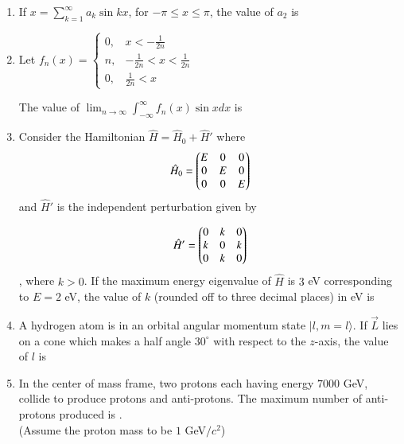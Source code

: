 \documentclass[journal,12pt,onecolumn]{IEEEtran}
\theoremstyle{remark}
\begin{document}
\begin{enumerate}
    \item If $x = \sum_{k=1}^{\infty} a_k \sin k x$, for $-\pi \leq x \leq \pi$, the value of $a_2$ is \underline{\hspace{2cm}}
    
    \item Let $f_n(x) = \begin{cases}
        0, & x < -\frac{1}{2n}\\
        n, & -\frac{1}{2n} < x < \frac{1}{2n}\\
        0, & \frac{1}{2n} < x
    \end{cases}$

    The value of $\lim_{n \rightarrow \infty} \int_{-\infty}^{\infty} f_n(x)\sin x dx$ is \underline{\hspace{2cm}}
    
    \item Consider the Hamiltonian $\hat{H} = \hat{H}_0 + \hat{H}'$ where
    \begin{align}
        \hat{H}_0 =
       \begin{pmatrix}
            E & 0 & 0 \\
            0 & E & 0 \\
            0 & 0 & E
        \end{pmatrix}
        \end{align}
        and $\hat{H}'$ is the independent perturbation given by
        
        \begin{align}
        \hat{H}' =
        \begin{pmatrix}
            0 & k & 0 \\
            k & 0 & k \\
            0 & k & 0\end{pmatrix}
        \end{align}
    , where $k > 0$. If the maximum energy eigenvalue of $\hat{H}$ is $3$ eV corresponding to $E = 2$ eV, the value of $k$ (rounded off to three decimal places) in eV is \underline{\hspace{2cm}}
    \item A hydrogen atom is in an orbital angular momentum state $|l,m = l \rangle$. If $\vec{L}$ lies on a cone which makes a half angle $30^\circ$ with respect to the $z$-axis, the value of $l$ is \underline{\hspace{2cm}}
    
    \item In the center of mass frame, two protons each having energy $7000$ GeV, collide to produce protons and anti-protons. The maximum number of anti-protons produced is \underline{\hspace{2cm}}.\\
    (Assume the proton mass to be $1$ GeV$/c^2$)


\end{enumerate}
\end{document}

